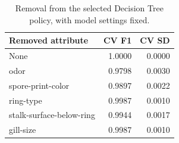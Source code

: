 \begin{table}[H]
\centering\small
\caption{Removal from the selected Decision Tree policy, with model settings fixed.}
\begin{tabular}{lrr}
\toprule
Removed attribute & CV F1 & CV SD \\
\midrule
None & 1.0000 & 0.0000 \\
odor & 0.9798 & 0.0030 \\
spore-print-color & 0.9897 & 0.0022 \\
ring-type & 0.9987 & 0.0010 \\
stalk-surface-below-ring & 0.9944 & 0.0017 \\
gill-size & 0.9987 & 0.0010 \\
\bottomrule
\end{tabular}
\end{table}
